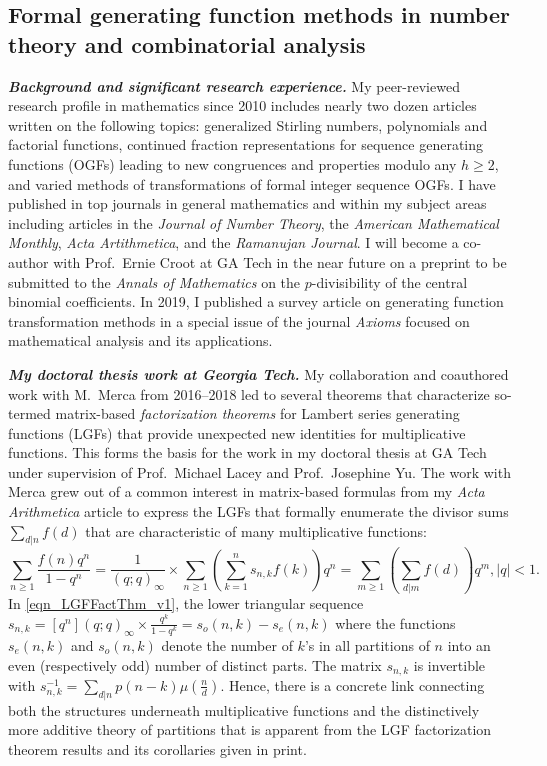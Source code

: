\documentclass[10pt,reqno,letterpaper]{article}
\theoremstyle{plain}
\numberwithin{theorem}{section}
\theoremstyle{definition}
\begin{document}
\subsection{Formal generating function methods in number theory and combinatorial analysis}

\noindent
{\small \textbf{\emph{Background and significant research experience.}}} 
My peer-reviewed research profile in mathematics since 2010 includes nearly two 
dozen articles written on the 
following topics: generalized Stirling numbers, polynomials and factorial functions, 
continued fraction representations for sequence generating functions (OGFs) leading to 
new congruences and properties modulo any $h \geq 2$, 
and varied methods of transformations of formal integer sequence OGFs.  
I have published in top journals in general mathematics and within my subject 
areas including articles in the \emph{Journal of Number Theory}, 
the \emph{American Mathematical Monthly}, \emph{Acta Artithmetica}, and the 
\emph{Ramanujan Journal}. 
I will become a co-author with 
Prof.~Ernie Croot at GA Tech in the near future on a preprint to be submitted to the 
\emph{Annals of Mathematics} on the $p$-divisibility of the 
central binomial coefficients. 
In 2019, I published a survey article on 
generating function transformation methods 
in a special issue of the journal \emph{Axioms} focused on 
mathematical analysis and its applications. 

\noindent 
{\small \textbf{\emph{My doctoral thesis work at Georgia Tech.}}} 
My collaboration and coauthored work with M.~Merca from 2016--2018 
led to several theorems that characterize 
so-termed matrix-based \emph{factorization theorems} for Lambert series generating functions (LGFs) 
that provide unexpected new identities for multiplicative functions. 
This forms the basis for the work in my doctoral thesis 
at GA Tech under supervision of Prof.~Michael Lacey and Prof.~Josephine Yu. 
The work with Merca grew out of a common interest in matrix-based formulas from my 
\emph{Acta Arithmetica} article \cite{MDS-NO-7} to express the 
LGFs that formally enumerate the divisor sums $\sum_{d|n} f(d)$ that are characteristic of many 
multiplicative functions: 
\begin{equation}
\label{eqn_LGFFactThm_v1} 
\sum_{n \geq 1} \frac{f(n)q^n}{1-q^n} = \frac{1}{(q; q)_{\infty}} \times \sum_{n \geq 1} \left( 
     \sum_{k=1}^{n} s_{n,k} f(k)\right) q^n = 
     \sum_{m \geq 1} \left(\sum_{d|m} f(d)\right) q^m, |q| < 1. 
\end{equation}
In \eqref{eqn_LGFFactThm_v1}, the lower triangular sequence 
$s_{n,k} = [q^n](q; q)_{\infty} \times \frac{q^k}{1-q^k} = s_o(n, k) - s_e(n, k)$ where 
the functions $s_e(n, k)$ and $s_o(n, k)$ denote the number of $k$'s in all 
partitions of $n$ into an even (respectively odd) number of distinct parts. The matrix $s_{n,k}$ is 
invertible with $s_{n,k}^{-1} = \sum_{d|n} p(n-k) \mu\left(\frac{n}{d}\right)$. 
Hence, there is a concrete link connecting both the structures underneath 
multiplicative functions and the distinctively more additive theory of partitions that is 
apparent from the LGF factorization theorem results and its corollaries given in print. 
\end{document}
